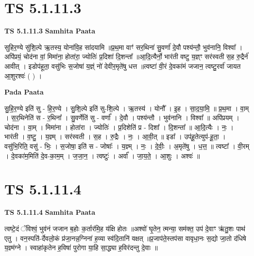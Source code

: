 \documentclass[17pt]{extarticle}
\begin{document}
\section*{ TS 5.1.11.3 }

\textbf{TS 5.1.11.3 } \newline
\textbf{Samhita Paata} \newline

सुहिर॒ण्ये सु॑शि॒ल्पे ऋ॒तस्य॒ योना॑वि॒ह सा॑दयामि ॥प्र॒थ॒मा वाꣳ॑ सर॒थिना॑ सु॒वर्णा॑ दे॒वौ पश्य॑न्तौ॒ भुव॑नानि॒ विश्वा᳚ । अपि॑प्रयं॒ चोद॑ना वां॒ मिमा॑ना॒ होता॑रा॒ ज्योतिः॑ प्र॒दिशा॑ दि॒शन्ता᳚ ॥आ॒दि॒त्यैर्नो॒ भार॑ती वष्टु य॒ज्ञ्ꣳ सर॑स्वती स॒ह रु॒द्रैर्न॑ आवीत् । इडोप॑हूता॒ वसु॑भिः स॒जोषा॑ य॒ज्ञ्ं नो॑ देवीर॒मृते॑षु धत्त ॥त्वष्टा॑ वी॒रं दे॒वका॑मं जजान॒ त्वष्टु॒रर्वा॑ जायत आ॒शुरश्वः॑ ( ) । \newline

\textbf{Pada Paata} \newline

सु॒हि॒र॒ण्ये इति॑ सु - हि॒र॒ण्ये । सु॒शि॒ल्पे इति॑ सु-शि॒ल्पे । ऋ॒तस्य॑ । योनौ᳚ । इ॒ह । सा॒द॒या॒मि॒ ॥ प्र॒थ॒मा । वा॒म् । स॒र॒थिनेति॑ स - र॒थिना᳚ । सु॒वर्णेति॑ सु - वर्णा᳚ । दे॒वौ । पश्य॑न्तौ । भुव॑नानि । विश्वा᳚ ॥ अपि॑प्रयम् । चोद॑ना । वा॒म् । मिमा॑ना । होता॑रा । ज्योतिः॑ । प्र॒दिशेति॑ प्र - दिशा᳚ । दि॒शन्ता᳚ ॥ आ॒दि॒त्यैः । नः॒ । भार॑ती । व॒ष्टु॒ । य॒ज्ञ्म् । सर॑स्वती । स॒ह । रु॒द्रैः । नः॒ । आ॒वी॒त् ॥ इडा᳚ । उप॑हू॒तेत्युप॑-हू॒ता॒ । वसु॑भि॒रिति॒ वसु॑ - भिः॒ । स॒जोषा॒ इति॑ स - जोषाः᳚ । य॒ज्ञ्म् । नः॒ । दे॒वीः॒ । अ॒मृते॑षु । ध॒त्त॒ ॥ त्वष्टा᳚ । वी॒रम् । दे॒वका॑म॒मिति॑ दे॒व-का॒म॒म् । ज॒जा॒न॒ । त्वष्टुः॑ । अर्वा᳚ । जा॒य॒ते॒ । आ॒शुः । अश्वः॑ ॥  \newline




\section*{ TS 5.1.11.4 }

\textbf{TS 5.1.11.4 } \newline
\textbf{Samhita Paata} \newline

त्वष्टे॒दं ॅविश्वं॒ भुव॑नं जजान ब॒होः क॒र्तार॑मि॒ह य॑क्षि होतः ॥अश्वो॑ घृ॒तेन॒ त्मन्या॒ सम॑क्त॒ उप॑ दे॒वाꣳ ऋ॑तु॒शः पाथ॑ एतु । वन॒स्पति॑-र्देवलो॒कं प्र॑जा॒नन्न॒ग्निना॑ ह॒व्या स्व॑दि॒तानि॑ वक्षत् ॥प्र॒जाप॑ते॒स्तप॑सा वावृधा॒नः स॒द्यो जा॒तो द॑धिषे य॒ज्ञ्म॑ग्ने । स्वाहा॑कृतेन ह॒विषा॑ पुरोगा या॒हि सा॒द्ध्या ह॒विर॑दन्तु दे॒वाः ॥ \newline
\end{document}
